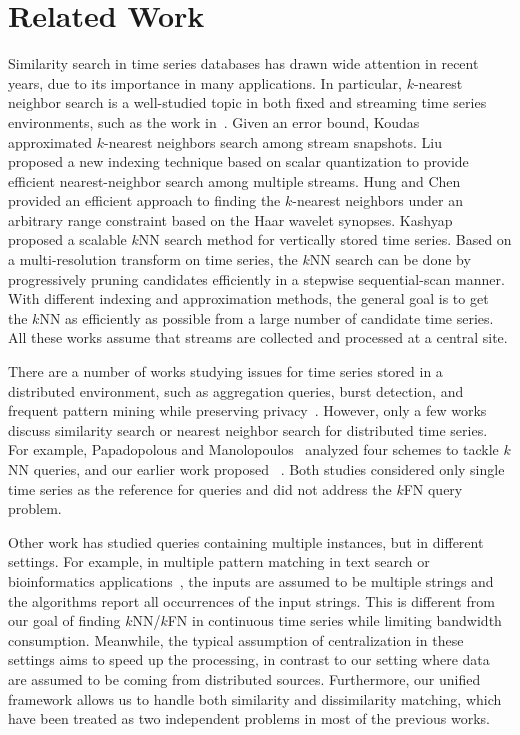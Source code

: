\section{Related Work}

Similarity search in time series databases has drawn wide attention
in recent years, due to its importance in many applications.
In particular, $k$-nearest neighbor search is a well-studied topic in both
fixed and streaming time series environments, such as the work
in~\cite{KOU04APP,LIU03EFF,HUN06EFF,Kashyap:2011:SKS}. 
Given an error bound, Koudas \etal~\cite{KOU04APP}
approximated $k$-nearest neighbors search among stream snapshots. Liu
\etal~\cite{LIU03EFF} proposed a new indexing technique based on
scalar quantization to provide efficient nearest-neighbor search among
multiple streams. Hung and Chen~\cite{HUN06EFF} provided an efficient
approach to finding the $k$-nearest neighbors under an arbitrary range
constraint based on the Haar wavelet synopses. Kashyap \etal~\cite{Kashyap:2011:SKS} 
proposed a scalable $k$NN search method
for vertically stored time series. Based on a multi-resolution
transform on time series, the $k$NN search can be done by
progressively pruning candidates efficiently in a stepwise
sequential-scan manner. With different indexing and approximation
methods, the general goal is to get the $k$NN as efficiently as possible
from a large number of candidate time series.  All these works assume that
streams are collected and processed at a central site.

There are a number of works studying issues for time series stored in a
distributed environment, such as aggregation queries, burst detection,
and frequent pattern mining while
preserving privacy~\cite{Rastogi:2010:DPA,Singh:privacy,daSilva:2007:PPP}. However,
only a few works discuss similarity search or nearest neighbor search
for distributed time series. For example, Papadopolous and Manolopoulos~\cite{PAP01DPS}
analyzed four schemes to tackle $k$NN queries, and our earlier work
proposed \LeeWave{}~\cite{Yeh:2008:LLD}.
Both studies considered only single time series as the reference for queries
and did not address the $k$FN query problem.

Other work has studied queries containing multiple instances, but in
different settings. For example, in
multiple pattern matching in text search or bioinformatics 
applications~\cite{Kandhan:2010:SFS,Kim99afast}, the inputs are
assumed to be multiple strings and the algorithms report all
occurrences of the input strings. This is different from our goal of
finding $k$NN/$k$FN in continuous time series while limiting
bandwidth consumption. Meanwhile, the typical assumption of centralization
in these settings aims to speed up the processing, in contrast to our setting
where data are assumed to be coming from distributed sources. Furthermore, our
unified framework allows us to handle both similarity and
dissimilarity matching, which have been treated as two independent
problems in most of the previous works.

